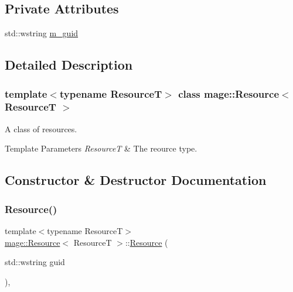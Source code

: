 \subsection*{Private Attributes}
\begin{DoxyCompactItemize}
\item 
std\+::wstring \mbox{\hyperlink{classmage_1_1_resource_a47049a8d37e7097cec53551ed118309c}{m\+\_\+guid}}
\end{DoxyCompactItemize}


\subsection{Detailed Description}
\subsubsection*{template$<$typename ResourceT$>$\newline
class mage\+::\+Resource$<$ Resource\+T $>$}

A class of resources.


\begin{DoxyTemplParams}{Template Parameters}
{\em ResourceT} & The reource type. \\
\hline
\end{DoxyTemplParams}


\subsection{Constructor \& Destructor Documentation}
\mbox{\label{classmage_1_1_resource_a10fbd756dae89a3ea9ba13a40c631238}} 
\subsubsection{\texorpdfstring{Resource()}{Resource()}\hspace{0.1cm}{\footnotesize\ttfamily [1/3]}}
{\footnotesize\ttfamily template$<$typename ResourceT$>$ \\
\mbox{\hyperlink{classmage_1_1_resource}{mage\+::\+Resource}}$<$ ResourceT $>$\+::\mbox{\hyperlink{classmage_1_1_resource}{Resource}} (\begin{DoxyParamCaption}\item[{std\+::wstring}]{guid }\end{DoxyParamCaption})\hspace{0.3cm}{\ttfamily [explicit]}, {\ttfamily [noexcept]}}

